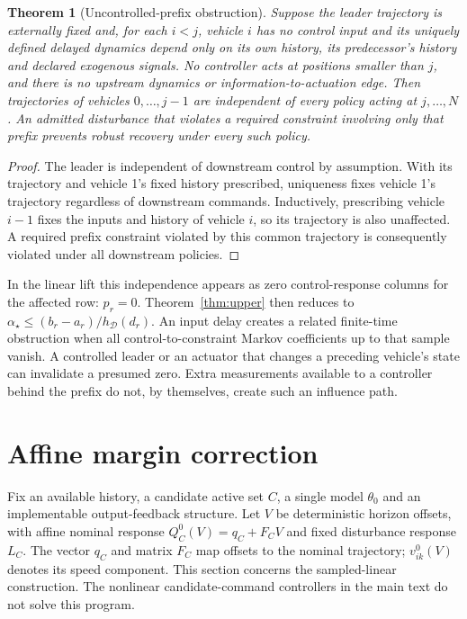 \documentclass[11pt]{article}
\newtheorem{theorem}{Theorem}
\newcommand{\astar}{\alpha_\star}
\begin{document}
\begin{theorem}[Uncontrolled-prefix obstruction]\label{thm:prefix}
Suppose the leader trajectory is externally fixed and, for each $i<j$, vehicle $i$ has no control input and its uniquely defined delayed dynamics depend only on its own history, its predecessor's history and declared exogenous signals. No controller acts at positions smaller than $j$, and there is no upstream dynamics or information-to-actuation edge. Then trajectories of vehicles $0,\ldots,j-1$ are independent of every policy acting at $j,\ldots,N$. An admitted disturbance that violates a required constraint involving only that prefix prevents robust recovery under every such policy.
\end{theorem}
\begin{proof}
The leader is independent of downstream control by assumption. With its trajectory and vehicle 1's fixed history prescribed, uniqueness fixes vehicle 1's trajectory regardless of downstream commands. Inductively, prescribing vehicle $i-1$ fixes the inputs and history of vehicle $i$, so its trajectory is also unaffected. A required prefix constraint violated by this common trajectory is consequently violated under all downstream policies.
\end{proof}

In the linear lift this independence appears as zero control-response columns for the affected row: $p_r=0$. Theorem~\ref{thm:upper} then reduces to $\astar\leq(b_r-a_r)/h_{\mathcal D}(d_r)$. An input delay creates a related finite-time obstruction when all control-to-constraint Markov coefficients up to that sample vanish. A controlled leader or an actuator that changes a preceding vehicle's state can invalidate a presumed zero. Extra measurements available to a controller behind the prefix do not, by themselves, create such an influence path.

\section{Affine margin correction}\label{sec:margin}
Fix an available history, a candidate active set $C$, a single model $\theta_0$ and an implementable output-feedback structure. Let $V$ be deterministic horizon offsets, with affine nominal response $Q_C^0(V)=q_C+F_CV$ and fixed disturbance response $L_C$. The vector $q_C$ and matrix $F_C$ map offsets to the nominal trajectory; $v^0_{ik}(V)$ denotes its speed component. This section concerns the sampled-linear construction. The nonlinear candidate-command controllers in the main text do not solve this program.
\end{document}
